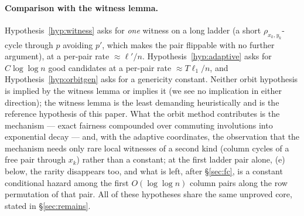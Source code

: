 \documentclass[11pt]{article}
\theoremstyle{definition}
\begin{document}
\paragraph{Comparison with the witness lemma.}  Hypothesis~\ref{hyp:witness} asks for
\emph{one} witness on a long ladder (a short $\rho_{x_k,y_k}$-cycle through $p$ avoiding
$p'$, which makes the pair flippable with no further argument), at a per-pair rate
$\approx\ell'/n$.  Hypothesis~\ref{hyp:adaptive} asks for $C\log\log n$ good candidates at
a per-pair rate $\approx T\ell_1/n$, and Hypothesis~\ref{hyp:orbitgen} asks for a
genericity constant.  Neither orbit hypothesis is implied by the witness lemma or implies
it (we see no implication in either direction); the witness lemma is the least demanding
heuristically and is the reference hypothesis of this paper.  What the orbit method contributes is the mechanism ---
exact fairness compounded over commuting involutions into exponential decay --- and, with
the adaptive coordinates, the observation that the mechanism needs only rare local
witnesses of a second kind (column cycles of a free pair through $x_k$) rather than a
constant; at the first ladder pair alone, (e) below, the rarity disappears too, and what is
left, after \S\ref{sec:fc}, is a constant conditional hazard among the first
$O(\log\log n)$ column pairs along the row permutation of that pair.  All of these
hypotheses share the same unproved core, stated in \S\ref{sec:remains}.
\end{document}
